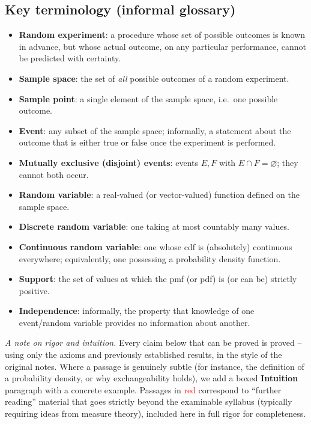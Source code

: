 \documentclass[11pt]{article}
\theoremstyle{definition}
\theoremstyle{plain}
\theoremstyle{remark}
\begin{document}
\subsection{Key terminology (informal glossary)}

\begin{itemize}[leftmargin=1.6em]
\item \textbf{Random experiment}: a procedure whose set of possible outcomes is known in advance, but whose actual outcome, on any particular performance, cannot be predicted with certainty.
\item \textbf{Sample space}: the set of \emph{all} possible outcomes of a random experiment.
\item \textbf{Sample point}: a single element of the sample space, i.e.\ one possible outcome.
\item \textbf{Event}: any subset of the sample space; informally, a statement about the outcome that is either true or false once the experiment is performed.
\item \textbf{Mutually exclusive (disjoint) events}: events $E,F$ with $E \cap F = \varnothing$; they cannot both occur.
\item \textbf{Random variable}: a real-valued (or vector-valued) function defined on the sample space.
\item \textbf{Discrete random variable}: one taking at most countably many values.
\item \textbf{Continuous random variable}: one whose cdf is (absolutely) continuous everywhere; equivalently, one possessing a probability density function.
\item \textbf{Support}: the set of values at which the pmf (or pdf) is (or can be) strictly positive.
\item \textbf{Independence}: informally, the property that knowledge of one event/random variable provides no information about another.
\end{itemize}

\bigskip
\textit{A note on rigor and intuition.} Every claim below that can be proved is proved --
using only the axioms and previously established results, in the style of the original notes.
Where a passage is genuinely subtle (for instance, the definition of a probability density, or
why exchangeability holds), we add a boxed \textbf{Intuition} paragraph with a concrete example.
Passages in \textcolor{red}{red} correspond to ``further reading'' material that goes strictly beyond
the examinable syllabus (typically requiring ideas from measure theory), included here in full
rigor for completeness.
\end{document}
